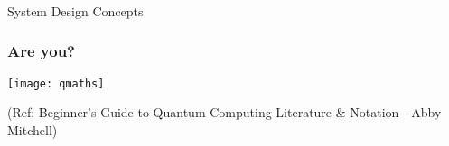 \begin{frame}[fragile]\frametitle{}
\begin{center}
{\Large System Design Concepts}
\end{center}

\end{frame}


 \begin{frame}[fragile]\frametitle{Are you?}

\begin{center}
\texttt{[image: qmaths]}
\end{center}

\tiny{(Ref: Beginner’s Guide to Quantum Computing Literature \& Notation - Abby Mitchell)}

\end{frame}

